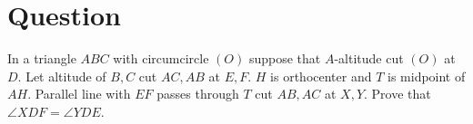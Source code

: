 \documentclass{extarticle}
\begin{document}
	\section{Question} %
	In a triangle $ABC$ with circumcircle $(O)$ suppose that $A$-altitude cut $(O)$ at $D$. Let altitude of $B,C$ cut $AC,AB$ at $E,F$. $H$ is orthocenter and $T$ is midpoint of $AH$. Parallel line with $EF$ passes through $T$ cut $AB,AC$ at $X,Y$. Prove that $\angle XDF = \angle YDE$.
	
\end{document}

